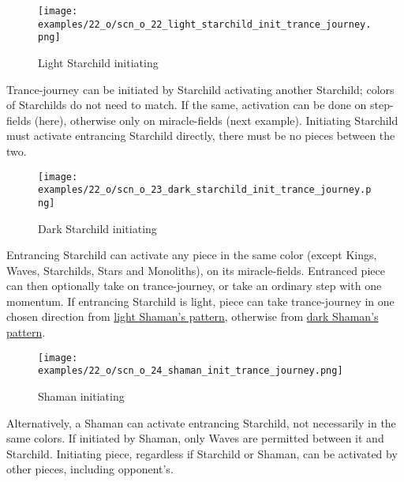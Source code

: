 \vspace*{-1.4\baselineskip}
\noindent
\begin{figure}[!h]
\texttt{[image: examples/22\_o/scn\_o\_22\_light\_starchild\_init\_trance\_journey.png]}
\caption{Light Starchild initiating}
\label{fig:scn_o_22_light_starchild_init_trance_journey}
\end{figure}

Trance-journey can be initiated by Starchild activating another Starchild;
colors of Starchilds do not need to match. If the same, activation can be
done on step-fields (here), otherwise only on miracle-fields (next example).
Initiating Starchild must activate entrancing Starchild directly, there must
be no pieces between the two.

\clearpage %

\vspace*{-2.1\baselineskip}
\noindent
\begin{figure}[!h]
\texttt{[image: examples/22\_o/scn\_o\_23\_dark\_starchild\_init\_trance\_journey.png]}
\caption{Dark Starchild initiating}
\label{fig:scn_o_23_dark_starchild_init_trance_journey}
\end{figure}

Entrancing Starchild can activate any piece in the same color (except Kings, Waves,
Starchilds, Stars and Monoliths), on its miracle-fields. Entranced piece can
then optionally take on trance-journey, or take an ordinary step with one momentum.
If entrancing Starchild is light, piece can take trance-journey in one chosen
direction from
\hyperref[fig:scn_cot_14_light_shaman_trance_journey]{light Shaman's pattern},
otherwise from
\hyperref[fig:scn_cot_16_dark_shaman_trance_journey]{dark Shaman's pattern}.

\clearpage %

\vspace*{-2.1\baselineskip}
\noindent
\begin{figure}[!h]
\texttt{[image: examples/22\_o/scn\_o\_24\_shaman\_init\_trance\_journey.png]}
\caption{Shaman initiating}
\label{fig:scn_o_24_shaman_init_trance_journey}
\end{figure}

\vspace*{-0.6\baselineskip}
Alternatively, a Shaman can activate entrancing Starchild, not necessarily in the same
colors. If initiated by Shaman, only Waves are permitted between it and Starchild.
Initiating piece, regardless if Starchild or Shaman, can be activated by other pieces,
including opponent's.

